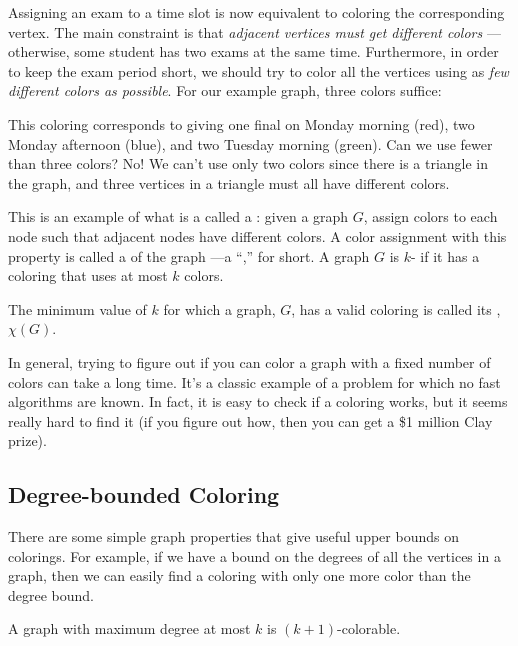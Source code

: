 Assigning an exam to a time slot is now equivalent to coloring the
corresponding vertex.  The main constraint is that \emph{adjacent vertices
  must get different colors} ---otherwise, some student has two exams at
the same time.  Furthermore, in order to keep the exam period short, we
should try to color all the vertices using as \emph{few different colors
  as possible}.  For our example graph, three colors suffice:


This coloring corresponds to giving one final on Monday morning (red),
two Monday afternoon (blue), and two Tuesday morning (green).
Can we use fewer than three colors?  No! We can't use only two colors
since there is a triangle in the graph, and three vertices in a triangle
must all have different colors.

This is an example of what is a called a :
given a graph $G$, assign colors to each node such that adjacent nodes
have different colors.  A color assignment with this property is called a
 of the graph ---a ``,'' for short.  A
graph $G$ is $k$- if it has a coloring that uses at most
$k$ colors.
\begin{definition}
  The minimum value of $k$ for which a graph, $G$, has a valid coloring is
  called its , $\chi(G)$.
\end{definition}

In general, trying to figure out if you can color a graph with a fixed
number of colors can take a long time.  It's a classic example of a
problem for which no fast algorithms are known.  In fact, it is easy to
check if a coloring works, but it seems really hard to find it (if you
figure out how, then you can get a \$1 million Clay prize).


\subsection{Degree-bounded Coloring}
There are some simple graph properties that give useful upper bounds on
colorings.  For example, if we have a bound on the degrees of all the
vertices in a graph, then we can easily find a coloring with only one more
color than the degree bound.

\begin{theorem}\label{k+1-colorable}
A graph with maximum degree at most $k$ is $(k+1)$-colorable.
\end{theorem}

